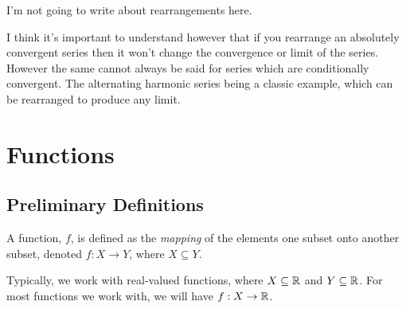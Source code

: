 \documentclass[12pt]{article}
\theoremstyle{definition}
\begin{document}
            \begin{note}
                I'm not going to write about rearrangements here.
                
                I think it's important to understand however that if you rearrange an absolutely convergent series then it won't change the convergence or limit of the series. However the same cannot always be said for series which are conditionally convergent. The alternating harmonic series being a classic example, which can be rearranged to produce any limit.
            \end{note}

    \section{Functions}
        \subsection{Preliminary Definitions}
            \begin{definition}
                A function, $f$, is defined as the \emph{mapping} of the elements one subset onto another subset, denoted $f: X \rightarrow Y$, where $X \subseteq Y$.
            \end{definition}
            \begin{remark}
                Typically, we work with real-valued functions, where $X \subseteq \R$ and $Y \subseteq \R$. For most functions we work with, we will have $f: X \rightarrow \R$.
            \end{remark}
\end{document}
